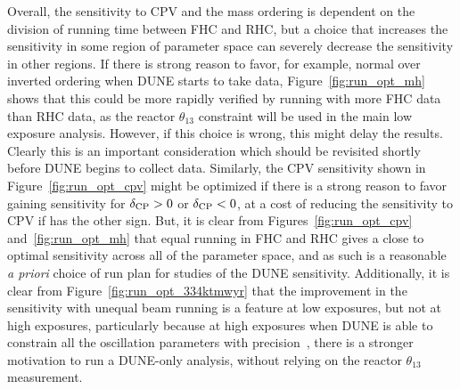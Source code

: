 Overall, the sensitivity to CPV and the mass ordering is dependent on the division of running time between FHC and RHC, but a choice that increases the sensitivity in some region of parameter space can severely decrease the sensitivity in other regions. If there is strong reason to favor, for example, normal over inverted ordering when DUNE starts to take data, Figure~\ref{fig:run_opt_mh} shows that this could be more rapidly verified by running with more FHC data than RHC data, as the reactor $\theta_{13}$ constraint will be used in the main low exposure analysis. However, if this choice is wrong, this might delay the results. Clearly this is an important consideration which should be revisited shortly before DUNE begins to collect data. Similarly, the CPV sensitivity shown in Figure~\ref{fig:run_opt_cpv} might be optimized if there is a strong reason to favor gaining sensitivity for $\delta_{\rm CP} > 0$ or $\delta_{\rm CP} < 0$, at a cost of reducing the sensitivity to CPV if \deltacp has the other sign. But, it is clear from Figures~\ref{fig:run_opt_cpv} and~\ref{fig:run_opt_mh} that equal running in FHC and RHC gives a close to optimal sensitivity across all of the parameter space, and as such is a reasonable {\it a priori} choice of run plan for studies of the DUNE sensitivity. Additionally, it is clear from Figure~\ref{fig:run_opt_334ktmwyr} that the improvement in the sensitivity with unequal beam running is a feature at low exposures, but not at high exposures, particularly because at high exposures when DUNE is able to constrain all the oscillation parameters with precision~\cite{Abi:2020qib}, there is a stronger motivation to run a DUNE-only analysis, without relying on the reactor $\theta_{13}$ measurement.


